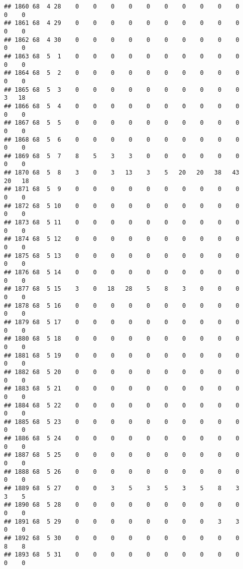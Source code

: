 \documentclass[]{article}
\begin{document}
\begin{verbatim}
## 1860 68  4 28    0    0    0    0    0    0    0    0    0    0    0    0
## 1861 68  4 29    0    0    0    0    0    0    0    0    0    0    0    0
## 1862 68  4 30    0    0    0    0    0    0    0    0    0    0    0    0
## 1863 68  5  1    0    0    0    0    0    0    0    0    0    0    0    0
## 1864 68  5  2    0    0    0    0    0    0    0    0    0    0    0    0
## 1865 68  5  3    0    0    0    0    0    0    0    0    0    0    3   18
## 1866 68  5  4    0    0    0    0    0    0    0    0    0    0    0    0
## 1867 68  5  5    0    0    0    0    0    0    0    0    0    0    0    0
## 1868 68  5  6    0    0    0    0    0    0    0    0    0    0    0    0
## 1869 68  5  7    8    5    3    3    0    0    0    0    0    0    0    0
## 1870 68  5  8    3    0    3   13    3    5   20   20   38   43   20   18
## 1871 68  5  9    0    0    0    0    0    0    0    0    0    0    0    0
## 1872 68  5 10    0    0    0    0    0    0    0    0    0    0    0    0
## 1873 68  5 11    0    0    0    0    0    0    0    0    0    0    0    0
## 1874 68  5 12    0    0    0    0    0    0    0    0    0    0    0    0
## 1875 68  5 13    0    0    0    0    0    0    0    0    0    0    0    0
## 1876 68  5 14    0    0    0    0    0    0    0    0    0    0    0    0
## 1877 68  5 15    3    0   18   28    5    8    3    0    0    0    0    0
## 1878 68  5 16    0    0    0    0    0    0    0    0    0    0    0    0
## 1879 68  5 17    0    0    0    0    0    0    0    0    0    0    0    0
## 1880 68  5 18    0    0    0    0    0    0    0    0    0    0    0    0
## 1881 68  5 19    0    0    0    0    0    0    0    0    0    0    0    0
## 1882 68  5 20    0    0    0    0    0    0    0    0    0    0    0    0
## 1883 68  5 21    0    0    0    0    0    0    0    0    0    0    0    0
## 1884 68  5 22    0    0    0    0    0    0    0    0    0    0    0    0
## 1885 68  5 23    0    0    0    0    0    0    0    0    0    0    0    0
## 1886 68  5 24    0    0    0    0    0    0    0    0    0    0    0    0
## 1887 68  5 25    0    0    0    0    0    0    0    0    0    0    0    0
## 1888 68  5 26    0    0    0    0    0    0    0    0    0    0    0    0
## 1889 68  5 27    0    0    3    5    3    5    3    5    8    3    3    5
## 1890 68  5 28    0    0    0    0    0    0    0    0    0    0    0    0
## 1891 68  5 29    0    0    0    0    0    0    0    0    3    3    0    0
## 1892 68  5 30    0    0    0    0    0    0    0    0    0    0    8    8
## 1893 68  5 31    0    0    0    0    0    0    0    0    0    0    0    0

\end{verbatim}
\end{document}

